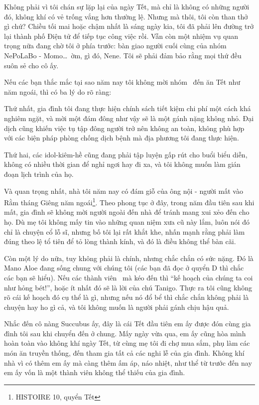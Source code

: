 \documentclass[../main.tex]{subfiles}
\begin{document}
Không phải vì tôi chán sự lặp lại của ngày Tết, mà chỉ là không có những người đó, không khí có vẻ trống vắng hơn thường lệ. Nhưng mà thôi, tôi còn than thở gì chứ? Chiều tối mai hoặc chậm nhất là sáng ngày kia, tôi đã phải lên đường trở lại thành phố Điện tử để tiếp tục công việc rồi. Vẫn còn một nhiệm vụ quan trọng nữa đang chờ tôi ở phía trước: bàn giao người cuối cùng của nhóm NePoLaBo - Momo\dots\ ờm, gì đó, Nene. Tôi sẽ phải đảm bảo rằng mọi thứ đều suôn sẻ cho cô ấy.

Nếu các bạn thắc mắc tại sao năm nay tôi không mời nhóm \hll\ đến ăn Tết như năm ngoái, thì có ba lý do rõ ràng:

Thứ nhất, gia đình tôi đang thực hiện chính sách tiết kiệm chi phí một cách khá nghiêm ngặt, và mời một đám đông như vậy sẽ là một gánh nặng không nhỏ. Đại dịch cũng khiến việc tụ tập đông người trở nên không an toàn, không phù hợp với các biện pháp phòng chống dịch bệnh mà địa phương tôi đang thực hiện.

Thứ hai, các idol-kiêm-hề cũng đang phải tập luyện gấp rút cho buổi biểu diễn, không có nhiều thời gian để nghỉ ngơi hay đi xa, và tôi không muốn làm gián đoạn lịch trình của họ.

Và quan trọng nhất, nhà tôi năm nay có đám giỗ của ông nội - người mất vào Rằm tháng Giêng năm ngoái\footnote{{\flaregothic HISTOIRE 10}, quyển Tết}. Theo phong tục ở đây, trong năm đầu tiên sau khi mất, gia đình sẽ không mời người ngoài đến nhà để tránh mang xui xẻo đến cho họ. Dù mẹ tôi không mấy tin vào những quan niệm xưa cũ này lắm, luôn nói đó chỉ là chuyện cổ lỗ sĩ, nhưng bố tôi lại rất khắt khe, nhấn mạnh rằng phải làm đúng theo lệ tổ tiên để tỏ lòng thành kính, và đó là điều không thể bàn cãi.

Còn một lý do nữa, tuy không phải là chính, nhưng chắc chắn có sức nặng. Đó là Mano Aloe đang sống chung với chúng tôi (các bạn đã đọc ở quyển D thì chắc các bạn sẽ hiểu). Nếu các thành viên \hll\ mà kéo đến thì ``kế hoạch của chúng ta coi như hỏng bét!'', hoặc ít nhất đó sẽ là lời của chú Tanigo. Thực ra tôi cũng không rõ cái kế hoạch đó cụ thể là gì, nhưng nếu nó đổ bể thì chắc chắn không phải là chuyện hay ho gì cả, và tôi không muốn là người phải gánh chịu hậu quả.

Nhắc đến cô nàng Succubus ấy, đây là cái Tết đầu tiên em ấy được đón cùng gia đình tôi sau khi chuyển đến ở chung. Mấy ngày vừa qua, em ấy cũng hòa mình hoàn toàn vào không khí ngày Tết, từ cùng mẹ tôi đi chợ mua sắm, phụ làm các món ăn truyền thống, đến tham gia tất cả các nghi lễ của gia đình. Không khí nhà vì có thêm em ấy mà càng thêm ấm áp, náo nhiệt, như thể từ trước đến nay em ấy vốn là một thành viên không thể thiếu của gia đình.
\end{document}
